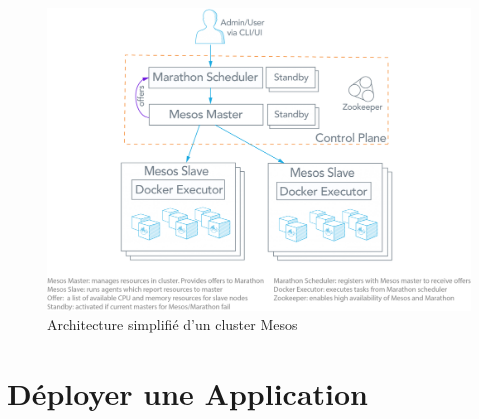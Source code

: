 \documentclass[11pt,fleqn]{book} %
\begin{document}
\begin{figure}[H]\centering
\renewcommand{\figurename}{Schéma}
\includegraphics[scale=0.35,trim={0 5cm 0 0},clip]{Pictures/Comparaison/mesos-architecture.png}
\captionsetup{margin=1.5cm,format=hang,justification=justified}
\caption[]{Architecture simplifié d'un cluster Mesos \newline}
\end{figure}



\chapter{Déployer une Application}
\label{A}
\vspace{-2cm}
\end{document}
